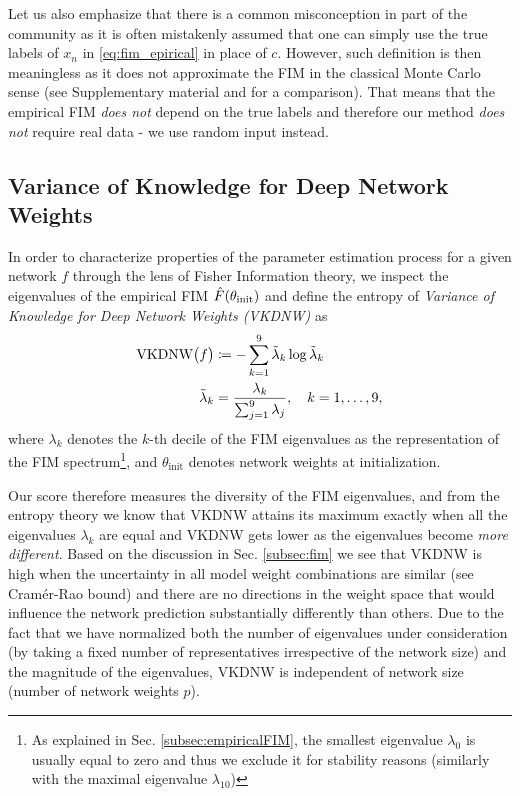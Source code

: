 Let us also emphasize that there is a common misconception in part of the community as it is often mistakenly assumed that one can simply use the true labels of $x_n$ in \eqref{eq:fim_epirical} in place of $c$. However, such definition is then meaningless as it does not approximate the FIM in the classical Monte Carlo sense (see Supplementary material and \cite{kunstner2019limitations} for a comparison). That means that the empirical FIM \textit{does not} depend on the true labels and therefore our method \textit{does not} require real data - we use random input instead.


\subsection{Variance of Knowledge for Deep Network Weights}
\label{subsec:vkdnw}

In order to characterize properties of the parameter estimation process for a given network $f$ through the lens of Fisher Information theory, we inspect the eigenvalues of the empirical FIM $\Hat{F}(\theta_{\text{init}})$ and define the entropy of \textit{Variance of Knowledge for Deep Network Weights (VKDNW)} as
\begin{align}
\label{eq:vkdnw}
    \text{VKDNW}\big(f\big) &\coloneq -\sum_{k=1}^9\tilde{\lambda}_k\log\Tilde{\lambda}_k \nonumber\\
    \tilde{\lambda}_k&=\frac{\lambda_k}{\sum_{j=1}^9\lambda_j}, \quad k=1,\dots, 9,
\end{align}
where $\lambda_k$ denotes the $k$-th decile of the FIM eigenvalues as the representation of the FIM spectrum\footnote{As explained in Sec. \ref{subsec:empiricalFIM}, the smallest eigenvalue $\lambda_0$ is usually equal to zero and thus we exclude it for stability reasons (similarly with the maximal eigenvalue $\lambda_{10}$)}, and $\theta_{\text{init}}$ denotes network weights at initialization.

Our score therefore measures the diversity of the FIM eigenvalues, and from the entropy theory we know that VKDNW attains its maximum exactly when all the eigenvalues $\lambda_k$ are equal and VKDNW gets lower as the eigenvalues become \textit{more different}. Based on the discussion in Sec. \ref{subsec:fim} we see that VKDNW is high when the uncertainty in all model weight combinations are similar (see Cramér-Rao bound) and there are no directions in the weight space that would influence the network prediction substantially differently than others. Due to the fact that we have normalized both the number of eigenvalues under consideration (by taking a fixed number of representatives irrespective of the network size) and the magnitude of the eigenvalues, VKDNW is independent of network size (number of network weights $p$).


